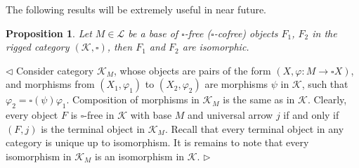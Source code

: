 \documentclass[12pt]{article}
\newtheorem{proposition}[theorem]{Proposition}
\newenvironment{proof}{\par $\triangleleft$}{$\triangleright$}
\begin{document}
The following results will be extremely useful in near future.

\begin{proposition}\label{PrUniqFr}
Let $M\in\mathcal{L}$ be a base of $\square$-free ($\square$-cofree) objects $F_1$, $F_2$ in the rigged category $(\mathcal{K},\square)$, then $F_1$ and $F_2$ are isomorphic.  
\end{proposition}
\begin{proof}
Consider category $\mathcal{K}_M$, whose objects are pairs of the form $(X,\varphi:M\to\square X)$, and morphisms from $(X_1,\varphi_1)$ to $(X_2,\varphi_2)$ are morphisms $\psi$ in 
$\mathcal{K}$, such that $\varphi_2=\square(\psi)\varphi_1$. Composition of morphisms in $\mathcal{K}_M$ is the same as in $\mathcal{K}$. Clearly, every object $F$ is $\square$-free in $\mathcal{K}$ with base $M$ and universal arrow $j$ if and only if $(F,j)$ is the terminal object in $\mathcal{K}_M$. Recall that every terminal object in any category is unique up to isomorphism. It is remains to note that every isomorphism in $\mathcal{K}_M$ is an isomorphism in $\mathcal{K}$.
\end{proof}
\end{document}
